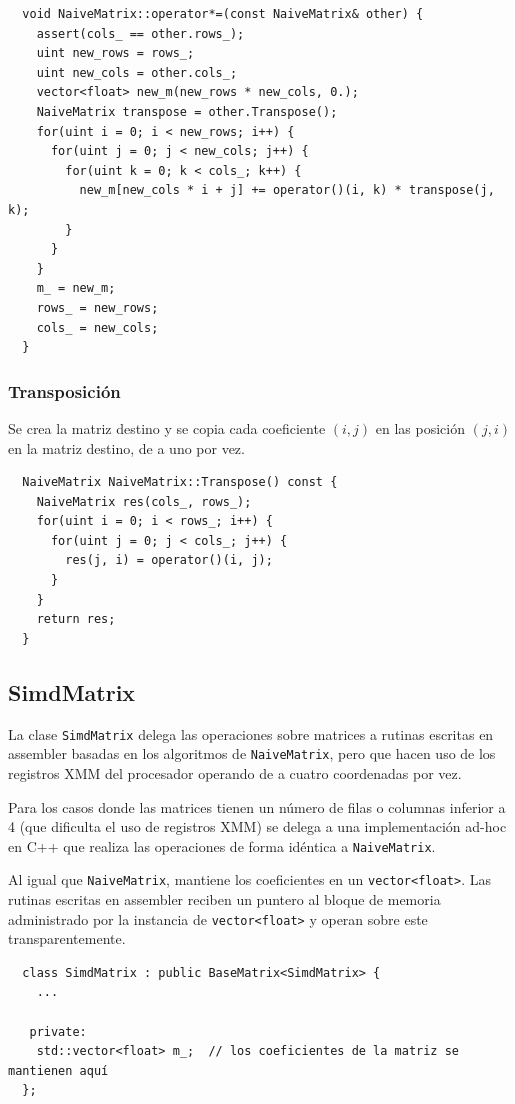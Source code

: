 \documentclass[a4paper, 10pt, twoside]{article}
\newcommand{\cc}[1]{\texttt{#1}}
\begin{document}
\begin{verbatim}
  void NaiveMatrix::operator*=(const NaiveMatrix& other) {
    assert(cols_ == other.rows_);
    uint new_rows = rows_;
    uint new_cols = other.cols_;
    vector<float> new_m(new_rows * new_cols, 0.);
    NaiveMatrix transpose = other.Transpose();
    for(uint i = 0; i < new_rows; i++) {
      for(uint j = 0; j < new_cols; j++) {
        for(uint k = 0; k < cols_; k++) {
          new_m[new_cols * i + j] += operator()(i, k) * transpose(j, k);
        }
      }
    }
    m_ = new_m;
    rows_ = new_rows;
    cols_ = new_cols;
  }
\end{verbatim}


\subsubsection{Transposición}

Se crea la matriz destino y se copia cada coeficiente $(i,j)$ en las posición
$(j,i)$ en la matriz destino, de a uno por vez.

\begin{verbatim}
  NaiveMatrix NaiveMatrix::Transpose() const {
    NaiveMatrix res(cols_, rows_);
    for(uint i = 0; i < rows_; i++) {
      for(uint j = 0; j < cols_; j++) {
        res(j, i) = operator()(i, j);
      }
    }
    return res;
  }
\end{verbatim}


\subsection{SimdMatrix}

La clase \cc{SimdMatrix} delega las operaciones sobre matrices a rutinas
escritas en assembler basadas en los algoritmos de \cc{NaiveMatrix}, pero que
hacen uso de los registros XMM del procesador operando de a cuatro coordenadas
por vez.

Para los casos donde las matrices tienen un número de filas o columnas inferior
a 4 (que dificulta el uso de registros XMM) se delega a una implementación
ad-hoc en C++ que realiza las operaciones de forma idéntica a \cc{NaiveMatrix}.

Al igual que \cc{NaiveMatrix}, mantiene los coeficientes en un
\cc{vector<float>}. Las rutinas escritas en assembler reciben un puntero al
bloque de memoria administrado por la instancia de \cc{vector<float>} y operan
sobre este transparentemente.

\begin{verbatim}
  class SimdMatrix : public BaseMatrix<SimdMatrix> {
    ...

   private:
    std::vector<float> m_;  // los coeficientes de la matriz se mantienen aquí
  };
\end{verbatim}
\end{document}

